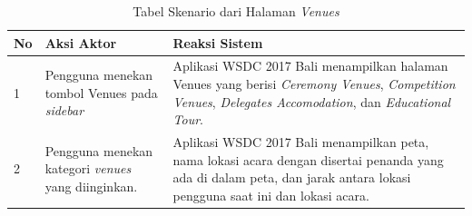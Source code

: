 \begin{enumerate}
		 \begin{table}[H]
			\centering
			\begin{tabular}{|p{0.5cm}|p{7cm}|p{7cm}|}
				\hline
				No & Aksi Aktor                               & Reaksi Sistem                                          \\ \hline
				1  & Pengguna menekan tombol Venues pada \textit{sidebar} & Aplikasi WSDC 2017 Bali menampilkan halaman Venues yang berisi {\it Ceremony Venues}, {\it Competition Venues}, {\it Delegates Accomodation}, dan {\it Educational Tour}.\\ \hline
				2  & Pengguna menekan kategori {\it venues} yang diinginkan. & Aplikasi WSDC 2017 Bali menampilkan peta, nama lokasi acara dengan disertai penanda yang ada di dalam peta, dan jarak antara lokasi pengguna saat ini dan lokasi acara.\\ \hline
			\end{tabular}
			\caption{Tabel Skenario dari Halaman {\it Venues}}
			\label{table:skenarioHalamanVenues}
		\end{table}


\end{enumerate}
